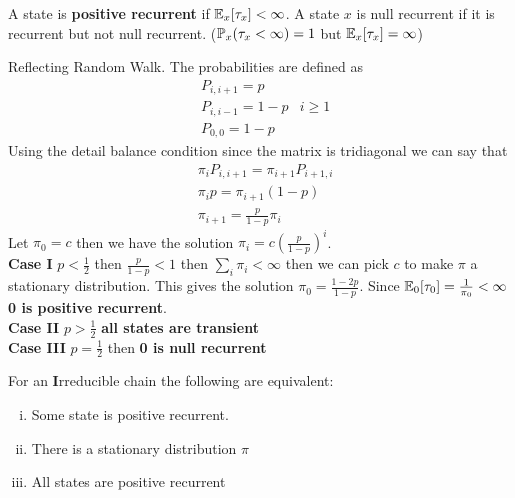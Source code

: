 \documentclass[12pt,a4paper]{article}
\begin{document}
\begin{defn}
$\;$\\
A state is \textbf{positive recurrent} if $\E_x[\tau_x] < \infty$. A state $x$ is null recurrent if it is recurrent but not null recurrent. ($\P_x(\tau_x < \infty) = 1$ but $\E_x[\tau_x] = \infty$)
\end{defn}
\begin{example}
Reflecting Random Walk. The probabilities are defined as 
\begin{align*}
&P_{i, i+1} = p\\
&P_{i, i-1} = 1 - p & i \geq 1\\
&P_{0,0} = 1-p
\end{align*}
Using the detail balance condition since the matrix is tridiagonal we can say that
\begin{align*}
&\pi_iP_{i, i+1} = \pi_{i+1}P_{i+1,i}\\
&\pi_ip = \pi_{i+1}(1-p)\\
&\pi_{i+1} = \frac{p}{1-p}\pi_i
\end{align*}
Let $\pi_0 = c$ then we have the solution $\pi_i =c\left( \frac{p}{1-p}\right)^i$. \\
\textbf{Case I} $p < \frac{1}{2}$ then $\frac{p}{1-p} < 1$ then $\sum_i \pi_i < \infty$ then we can pick $c$ to make $\pi$ a stationary distribution.  This gives the solution $\pi_0 = \frac{1-2p}{1-p}$. Since $\E_0[\tau_0] = \frac{1}{\pi_0} < \infty$ \textbf{0 is positive recurrent}. \\
\textbf{Case II} $p > \frac{1}{2}$ \textbf{all states are transient}\\
\textbf{Case III} $p = \frac{1}{2}$ then \textbf{0 is null recurrent} 
\end{example}
\begin{thm}
For an \textbf{I}rreducible chain the following are equivalent:
\begin{enumerate}[(i)]
\item  Some state is positive recurrent.
\item  There is a stationary distribution $\pi$
\item  All states are positive recurrent
\end{enumerate}
\end{thm}
\newpage
\end{document}
